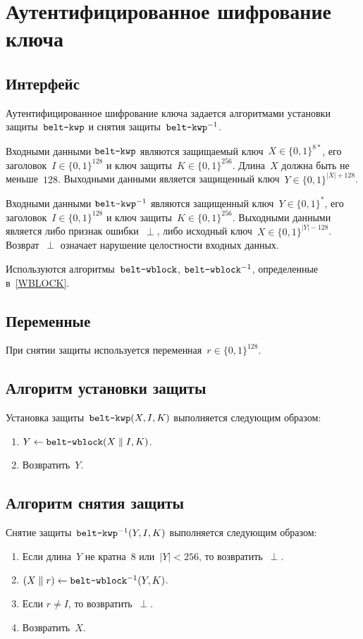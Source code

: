 \section{Аутентифицированное шифрование ключа}\label{KWP}

\subsection{Интерфейс}\label{KWP.IFace}

Аутентифицированное шифрование ключа задается алгоритмами установки 
защиты~$\texttt{belt-kwp}$ и снятия защиты~$\texttt{belt-kwp}^{-1}$.

Входными данными $\texttt{belt-kwp}$ являются защищаемый 
ключ~$X\in\{0,1\}^{8*}$, его заголовок~$I\in\{0,1\}^{128}$ и ключ 
защиты~$K\in\{0,1\}^{256}$. Длина~$X$ должна быть не меньше~$128$.
%
Выходными данными является защищенный ключ~$Y\in\{0,1\}^{|X|+128}$.

Входными данными $\texttt{belt-kwp}^{-1}$ являются защищенный
ключ~$Y\in\{0,1\}^*$, его заголовок~$I\in\{0,1\}^{128}$ и ключ
защиты~$K\in\{0,1\}^{256}$.
%
Выходными данными является либо признак ошибки~$\perp$,
либо исходный ключ~$X\in\{0,1\}^{|Y|-128}$.
%
Возврат~$\perp$ означает нарушение целостности входных данных.

Используются алгоритмы~$\texttt{belt-wblock}$, $\texttt{belt-wblock}^{-1}$,
определенные в~\ref{WBLOCK}.

\subsection{Переменные}\label{KWP.Vars}

При снятии защиты используется переменная~$r\in\{0,1\}^{128}$.

\subsection{Алгоритм установки защиты}\label{KWP.Wrap}

Установка защиты~$\texttt{belt-kwp}(X,I,K)$ выполняется следующим образом:
\begin{enumerate}
\item
$Y\leftarrow\texttt{belt-wblock}(X\parallel I,K)$.

\item
Возвратить~$Y$.
\end{enumerate}

\subsection{Алгоритм снятия защиты}\label{KWP.Unwrap}

Снятие защиты~$\texttt{belt-kwp}^{-1}(Y,I,K)$ выполняется следующим образом:
\begin{enumerate}
\item
Если длина~$Y$ не кратна~$8$ или~$|Y|<256$, то возвратить~$\perp$.
\item
$(X\parallel r)\leftarrow \texttt{belt-wblock}^{-1}(Y,K)$.
\item
Если $r\neq I$, то возвратить~$\perp$.
\item
Возвратить~$X$.
\end{enumerate}
